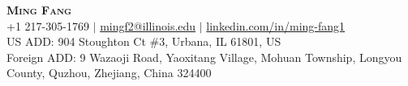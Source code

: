 \documentclass[letterpaper,11pt]{article} %
\begin{document}

% 
\begin{comment}
In Europe it is common to include a picture of ones self in the CV. Select
which heading appropriate for the document you are creating.
\end{comment}


\begin{center}
    \textbf{\Huge \scshape Ming Fang} \\ \vspace{1pt} %
    \small 
    +1 217-305-1769 $|$
    \href{mailto:mingf2@illinois.edu}{{mingf2@illinois.edu}} $|$
    \href{{https://www.linkedin.com/in/ming-fang1}}{linkedin.com/in/ming-fang1}\\ \vspace{1pt}
    {US ADD: 904 Stoughton Ct \#3, Urbana, IL 61801, US}\\ \vspace{1pt}
    {Foreign ADD: 9 Wazaoji Road, Yaoxitang Village, Mohuan Township, Longyou County, Quzhou, Zhejiang, China 324400}
\end{center}
\end{document}
